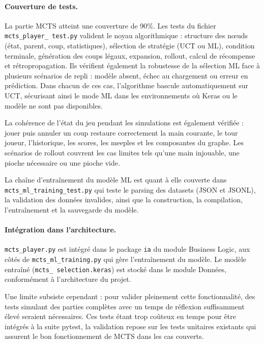 \documentclass[11pt]{article}
\begin{document}
\paragraph{Couverture de tests.}
La partie MCTS atteint une couverture de 90\%. Les tests du fichier 
\texttt{mcts\_player\_ \allowbreak test.py} valident le noyau algorithmique : 
structure des nœuds (état, parent, coup, statistiques), sélection de 
stratégie (UCT ou ML), condition terminale, génération des coups 
légaux, expansion, rollout, calcul de récompense et rétropropagation. 
Ils vérifient également la robustesse de la sélection ML face à 
plusieurs scénarios de repli : modèle absent, échec au chargement ou 
erreur en prédiction. Dans chacun de ces cas, l'algorithme bascule 
automatiquement sur UCT, sécurisant ainsi le mode ML dans les 
environnements où Keras ou le modèle ne sont pas disponibles.

La cohérence de l'état du jeu pendant les simulations est également 
vérifiée : jouer puis annuler un coup restaure correctement la main 
courante, le tour joueur, l'historique, les scores, les meeples et 
les composantes du graphe. Les scénarios de rollout couvrent les cas 
limites tels qu'une main injouable, une pioche nécessaire ou une 
pioche vide.

La chaîne d'entraînement du modèle ML est quant à elle couverte dans 
\texttt{mcts\_ml\_training\_test.py} qui teste le parsing des 
datasets (JSON et JSONL), la validation des données invalides, ainsi 
que la construction, la compilation, l'entraînement et la sauvegarde 
du modèle.

\paragraph{Intégration dans l'architecture.}
\texttt{mcts\_player.py} est intégré dans le package \texttt{ia} du 
module Business Logic, aux côtés de \texttt{mcts\_ml\_training.py} 
qui gère l'entraînement du modèle. Le modèle entraîné 
(\texttt{mcts\_ \allowbreak selection.keras}) est stocké dans le module Données, 
conformément à l'architecture du projet.

Une limite subsiste cependant : pour valider pleinement cette 
fonctionnalité, des tests simulant des parties complètes avec un 
temps de réflexion suffisamment élevé seraient nécessaires. Ces tests 
étant trop coûteux en temps pour être intégrés à la suite pytest, la 
validation repose sur les tests unitaires existants qui assurent le 
bon fonctionnement de MCTS dans les cas couverts.
\end{document}
